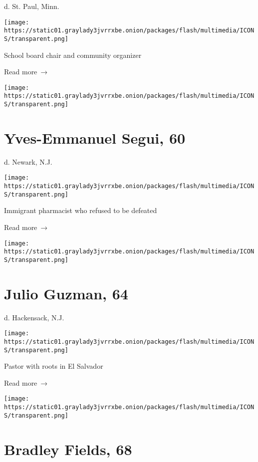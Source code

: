 d. St. Paul, Minn.

\texttt{[image: https://static01.graylady3jvrrxbe.onion/packages/flash/multimedia/ICONS/transparent.png]}

School board chair and community organizer

 Read more~→

\href{https://www.nytimes3xbfgragh.onion/2020/06/10/obituaries/yves-emmanuel-segui-dead-coronavirus.html}{}

\texttt{[image: https://static01.graylady3jvrrxbe.onion/packages/flash/multimedia/ICONS/transparent.png]}

\hypertarget{yves-emmanuel-segui-60}{%
\section{Yves-Emmanuel Segui, 60}\label{yves-emmanuel-segui-60}}

d. Newark, N.J.

\texttt{[image: https://static01.graylady3jvrrxbe.onion/packages/flash/multimedia/ICONS/transparent.png]}

Immigrant pharmacist who refused to be defeated

 Read more~→

\href{https://www.nytimes3xbfgragh.onion/2020/06/09/obituaries/julio-guzman-dead-coronavirus.html}{}

\texttt{[image: https://static01.graylady3jvrrxbe.onion/packages/flash/multimedia/ICONS/transparent.png]}

\hypertarget{julio-guzman-64}{%
\section{Julio Guzman, 64}\label{julio-guzman-64}}

d. Hackensack, N.J.

\texttt{[image: https://static01.graylady3jvrrxbe.onion/packages/flash/multimedia/ICONS/transparent.png]}

Pastor with roots in El Salvador

 Read more~→

\href{https://www.nytimes3xbfgragh.onion/2020/06/08/obituaries/bradley-fields-dead-coronavirus.html}{}

\texttt{[image: https://static01.graylady3jvrrxbe.onion/packages/flash/multimedia/ICONS/transparent.png]}

\hypertarget{bradley-fields-68}{%
\section{Bradley Fields, 68}\label{bradley-fields-68}}

